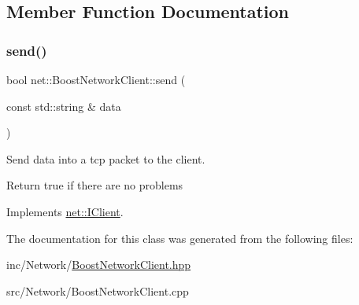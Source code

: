 \subsection{Member Function Documentation}
\mbox{\label{classnet_1_1BoostNetworkClient_af584270d274c31b315eba24effd86b46}} 
\subsubsection{\texorpdfstring{send()}{send()}}
{\footnotesize\ttfamily bool net\+::\+Boost\+Network\+Client\+::send (\begin{DoxyParamCaption}\item[{const std\+::string \&}]{data }\end{DoxyParamCaption})\hspace{0.3cm}{\ttfamily [virtual]}}



Send \textquotesingle{}data\textquotesingle{} into a tcp packet to the client. 

Return true if there are no problems 

Implements \hyperlink{structnet_1_1IClient_a44691ffe41185a41b5637d7c0068b5f2}{net\+::\+I\+Client}.



The documentation for this class was generated from the following files\+:\begin{DoxyCompactItemize}
\item 
inc/\+Network/\hyperlink{BoostNetworkClient_8hpp}{Boost\+Network\+Client.\+hpp}\item 
src/\+Network/Boost\+Network\+Client.\+cpp\end{DoxyCompactItemize}
